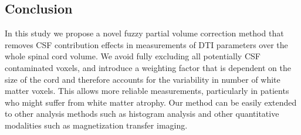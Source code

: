 \subsection*{Conclusion}
In this study we propose a novel fuzzy partial volume correction method that removes CSF contribution effects in measurements of DTI parameters over the whole spinal cord volume. We avoid fully excluding all potentially CSF contaminated voxels, and introduce a weighting factor that is dependent on the size of the cord and therefore accounts for the variability in number of white matter voxels. This allows more reliable measurements, particularly in patients who might suffer from white matter atrophy. Our method can be easily extended to other analysis methods such as histogram analysis and other quantitative modalities such as magnetization transfer imaging.

